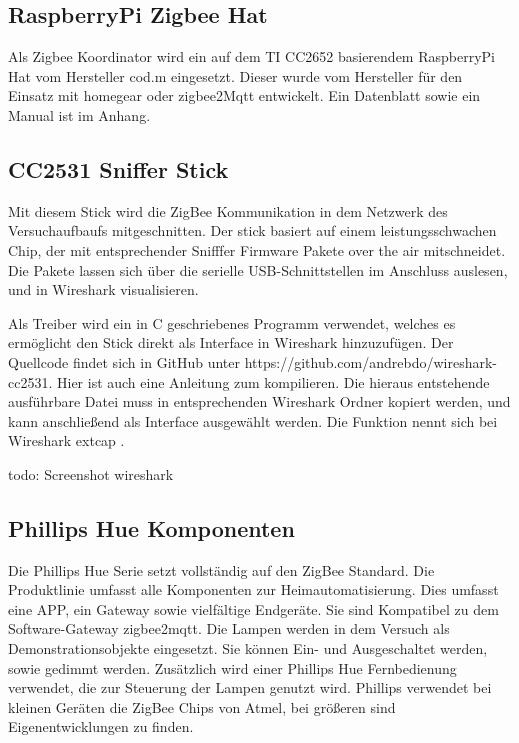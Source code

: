 \subsection{RaspberryPi Zigbee Hat}

Als Zigbee Koordinator wird ein auf dem TI CC2652 basierendem RaspberryPi Hat vom Hersteller \grqq cod.m \grqq{} eingesetzt. Dieser wurde vom Hersteller
für den Einsatz mit \grqq homegear \grqq{} oder \grqq zigbee2Mqtt \grqq{} entwickelt. Ein Datenblatt sowie ein Manual ist im Anhang.

\subsection{CC2531 Sniffer Stick}

Mit diesem Stick wird die ZigBee Kommunikation in dem Netzwerk des Versuchaufbaufs mitgeschnitten.
Der stick basiert auf einem leistungsschwachen Chip, der mit entsprechender \grqq Snifffer \grqq{} Firmware Pakete \grqq over the air \grqq{} mitschneidet.
Die Pakete lassen sich über die serielle USB-Schnittstellen im Anschluss auslesen, und in Wireshark visualisieren. 

Als Treiber wird ein in C geschriebenes Programm verwendet, welches es ermöglicht den Stick direkt als Interface in Wireshark hinzuzufügen. Der Quellcode findet sich in 
GitHub unter https://github.com/andrebdo/wireshark-cc2531. Hier ist auch eine Anleitung zum kompilieren. Die hieraus entstehende ausführbare Datei muss in entsprechenden
Wireshark Ordner kopiert werden, und kann anschließend als Interface ausgewählt werden. Die Funktion nennt sich bei Wireshark \grqq extcap \grqq{}.

todo: Screenshot wireshark

\subsection{Phillips Hue Komponenten}

Die Phillips Hue Serie setzt vollständig auf den ZigBee Standard. Die Produktlinie umfasst alle Komponenten zur Heimautomatisierung. Dies umfasst eine APP,
ein Gateway sowie vielfältige Endgeräte. Sie sind Kompatibel zu dem Software-Gateway zigbee2mqtt.
Die Lampen werden in dem Versuch als Demonstrationsobjekte eingesetzt. Sie können Ein- und Ausgeschaltet werden, sowie gedimmt werden. Zusätzlich wird einer
Phillips Hue Fernbedienung verwendet, die zur Steuerung der Lampen genutzt wird. Phillips verwendet bei kleinen Geräten die ZigBee Chips von Atmel, bei größeren 
sind Eigenentwicklungen zu finden.

